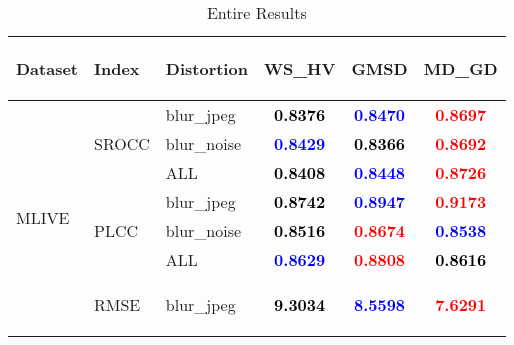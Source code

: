 \documentclass{article}
\begin{document}
\begin{table}
\scriptsize
\caption{Entire Results}
\label{tbl:whole}
\begin{tabular}{||l|l|l||ccc||}
\toprule
\toprule
\begin{turn}{-90}\textbf{Dataset}\end{turn}&\begin{turn}{-90}\textbf{Index}\end{turn}&\begin{turn}{-90}\textbf{Distortion}\end{turn}&\begin{turn}{-90}\textbf{WS\_HV}\end{turn}&\begin{turn}{-90}\textbf{GMSD}\end{turn}&\begin{turn}{-90}\textbf{MD\_GD}\end{turn}\\
\midrule
\midrule
\multirow{12}{*}{\begin{turn}{-90}MLIVE\end{turn}}&\multirow{3}{*}{\begin{turn}{-90}SROCC\end{turn}}&blur_jpeg&\textbf{\textcolor{black}{0.8376}}&\textbf{\textcolor{blue}{0.8470}}&\textbf{\textcolor{red}{0.8697}}\\
\cmidrule{3-6}
&&blur_noise&\textbf{\textcolor{blue}{0.8429}}&\textbf{\textcolor{black}{0.8366}}&\textbf{\textcolor{red}{0.8692}}\\
\cmidrule{3-6}
&&ALL&\textbf{\textcolor{black}{0.8408}}&\textbf{\textcolor{blue}{0.8448}}&\textbf{\textcolor{red}{0.8726}}\\
\cmidrule{2-6}\cmidrule{2-6}
&\multirow{3}{*}{\begin{turn}{-90}PLCC\end{turn}}&blur_jpeg&\textbf{\textcolor{black}{0.8742}}&\textbf{\textcolor{blue}{0.8947}}&\textbf{\textcolor{red}{0.9173}}\\
\cmidrule{3-6}
&&blur_noise&\textbf{\textcolor{black}{0.8516}}&\textbf{\textcolor{red}{0.8674}}&\textbf{\textcolor{blue}{0.8538}}\\
\cmidrule{3-6}
&&ALL&\textbf{\textcolor{blue}{0.8629}}&\textbf{\textcolor{red}{0.8808}}&\textbf{\textcolor{black}{0.8616}}\\
\cmidrule{2-6}\cmidrule{2-6}
&\multirow{3}{*}{\begin{turn}{-90}RMSE\end{turn}}&blur_jpeg&\textbf{\textcolor{black}{9.3034}}&\textbf{\textcolor{blue}{8.5598}}&\textbf{\textcolor{red}{7.6291}}\\

\end{tabular}
\end{table}
\end{document}
